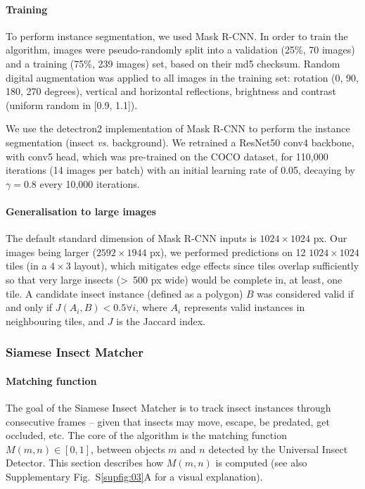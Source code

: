 \documentclass[fleqn,10pt]{wlscirep}
\begin{document}
\paragraph{Training}
To perform instance segmentation, we used Mask R-CNN\cite{he_mask_2017}. In order to train the algorithm, images were pseudo-randomly split into a validation (25\%, 70 images) and a training (75\%, 239 images) set, based on their md5 checksum. Random digital augmentation was applied to all images in the training set: rotation (0, 90, 180, 270 degrees), vertical and horizontal reflections, brightness and contrast (uniform random in [0.9, 1.1]). 

We use the detectron2 implementation \cite{wu_detectron2_2019} of Mask R-CNN to perform the instance segmentation (insect \emph{vs.} background). We retrained a ResNet50 conv4 backbone, with conv5 head, which was pre-trained on the COCO dataset, for 110,000 iterations (14 images per batch) with an initial learning rate of 0.05, decaying by $\gamma=0.8$ every 10,000 iterations.

\paragraph{Generalisation to large images}
The default standard dimension of Mask R-CNN inputs is $1024 \times{} 1024$ px. 
Our images being larger ($2592 \times{} 1944$ px), we performed predictions on 12 $1024 \times{}1024$ tiles (in a $4 \times{} 3$ layout), which mitigates edge effects since tiles overlap sufficiently so that very large insects (>~500 px wide) would be complete in, at least, one tile. A candidate insect instance (defined as a polygon) $B$ was considered valid if and only if $J(A_{i}, B) < 0.5 \forall i$, where $A_i$ represents valid instances in neighbouring tiles, and $J$ is the Jaccard index.

\subsubsection*{Siamese Insect Matcher}
\paragraph{Matching function}
The goal of the Siamese Insect Matcher is to track insect instances through consecutive frames – given that insects may move, escape, be predated, get occluded, etc. The core of the algorithm is the matching function $M(m,n) \in [0, 1]$, between objects $m$ and $n$ detected by the Universal Insect Detector. This section describes how $M(m,n)$ is computed (see also Supplementary Fig.~S\ref{supfig:03}A for a visual explanation).
\end{document}
